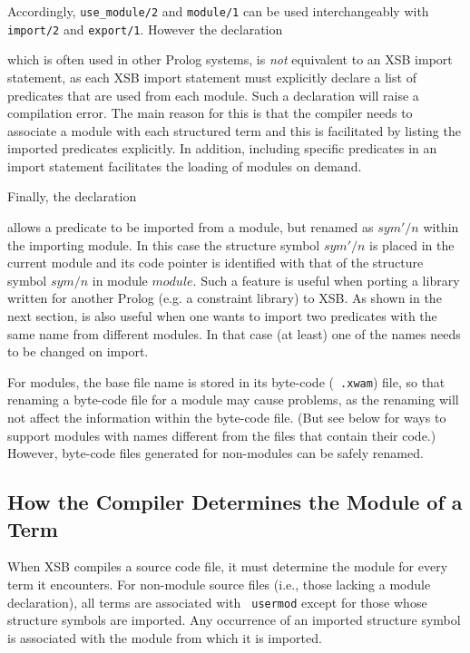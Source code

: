 
\noindent
Accordingly, {\tt use\_module/2} and {\tt module/1} can be used
interchangeably with {\tt import/2} and {\tt export/1}.  However the
declaration


\noindent
which is often used in other Prolog systems, is {\em not} equivalent
to an XSB import statement, as each XSB import statement must
explicitly declare a list of predicates that are used from each
module.  Such a declaration will raise a compilation error. The main
reason for this is that the compiler needs to associate a module with
each structured term and this is facilitated by listing the imported
predicates explicitly.  In addition, including specific predicates in
an import statement facilitates the loading of modules on demand.

Finally, the declaration 


\noindent
allows a predicate to be imported from a module, but renamed as
$sym'/n$ within the importing module.  In this case the structure
symbol $sym'/n$ is placed in the current module and its code pointer
is identified with that of the structure symbol $sym/n$ in module
$module$.  Such a feature is useful when porting a library written for
another Prolog (e.g. a constraint library) to XSB.  As shown in the
next section, is also useful when one wants to import two predicates
with the same name from different modules.  In that case (at least)
one of the names needs to be changed on import.

For modules, the base file name is stored in its byte-code ({\tt
  .xwam}) file, so that renaming a byte-code file for a module may cause
problems, as the renaming will not affect the information within the
byte-code file.  (But see below for ways to support modules with
names different from the files that contain their code.)
However, byte-code files generated for non-modules
can be safely renamed.

\subsection{How the Compiler Determines the Module of a Term}

When XSB compiles a source code file, it must determine the module for
every term it encounters.  For non-module source files (i.e., those
lacking a module declaration), all terms are associated with {\tt
  usermod} except for those whose structure symbols are imported.  Any
occurrence of an imported structure symbol is associated with the
module from which it is imported.

